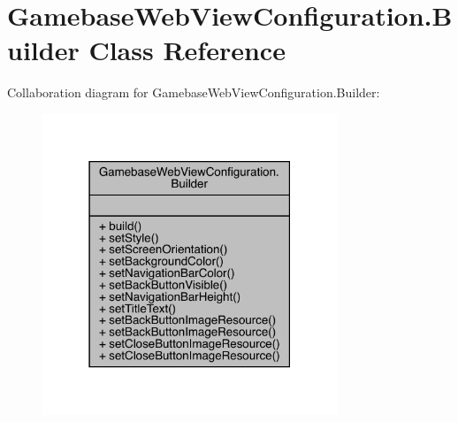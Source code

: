 \hypertarget{classcom_1_1toast_1_1android_1_1gamebase_1_1_gamebase_web_view_configuration_1_1_builder}{}\section{Gamebase\+Web\+View\+Configuration.\+Builder Class Reference}
\label{classcom_1_1toast_1_1android_1_1gamebase_1_1_gamebase_web_view_configuration_1_1_builder}


Collaboration diagram for Gamebase\+Web\+View\+Configuration.\+Builder\+:
\nopagebreak
\begin{figure}[H]
\begin{center}
\leavevmode
\includegraphics[width=250pt]{classcom_1_1toast_1_1android_1_1gamebase_1_1_gamebase_web_view_configuration_1_1_builder__coll__graph}
\end{center}
\end{figure}

